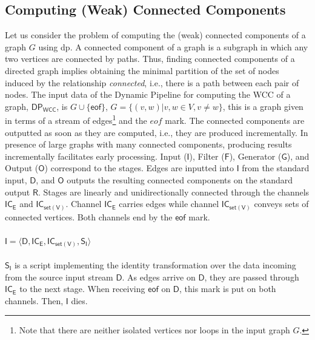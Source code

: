 \documentclass[preprint]{elsarticle}
\newcommand{\dpwcc}{\mathsf{DP_{WCC}}}
\newcommand{\iwcc}{\mathsf{I}}
\newcommand{\owcc}{\mathsf{O}}
\newcommand{\fwcc}{\mathsf{F}}
\newcommand{\gwcc}{\mathsf{G}}
\newcommand{\ice}{\mathsf{IC_E}}
\newcommand{\csofv}{\mathsf{IC_{set(V)}}}
\newcommand{\sinp}{\mathsf{S_I}}
\newcommand{\istream}{\mathsf{D}}
\newcommand{\wccout}{\mathsf{R}}
\newcommand{\eof}{\mathsf{eof}}
\begin{document}
\subsection{Computing (Weak) Connected Components}\label{sub:sec:mot:ex}
Let us consider the problem of computing the (weak) connected components of a graph $G$ using \acrshort{dp}. A connected component of a graph is a subgraph in which any two vertices are connected by paths. Thus, finding connected components of a directed graph implies obtaining the minimal partition of the set of nodes induced by the relationship \textit{connected}, i.e., there is a path between each pair of nodes. The input data of the Dynamic Pipeline for computing the WCC of a graph, $\dpwcc$, is  $G\cup\{\eof\}$, $G=\{(v,w) | v,w\in V, v\neq w\}$, this is a graph given in terms of a stream of edges\footnote{Note that there are neither isolated vertices nor loops in the input graph $G $.} and the $eof$ mark. The connected components are outputted as soon as they are computed, i.e., they are produced incrementally. In presence of large graphs with many connected components, producing results incrementally facilitates early processing. 
 Input ($\iwcc$), Filter ($\fwcc$), Generator ($\gwcc$), and  Output ($\owcc$) correspond to the stages. 
 Edges are inputted into $\iwcc$ from the standard input, $\istream$, and $\owcc$ outputs the resulting connected components on the standard output $\wccout$. Stages are linearly and unidirectionally connected through the channels $\ice$ and  $\csofv$. Channel $\ice$ carries edges while channel  $\csofv$ conveys sets of connected vertices. Both channels end by the $\eof$ mark.

\paragraph{$\iwcc=\langle \istream, \ice,\csofv, \sinp  \rangle$} $\sinp$ is a script implementing the identity transformation over the data incoming from the source input stream $\istream$.  As edges arrive on $\istream$, they are passed through  $\ice$ to the next stage. When receiving $\eof$ on  $\istream$, this mark is put on both channels. Then, $\iwcc$ dies.
%
\end{document}
